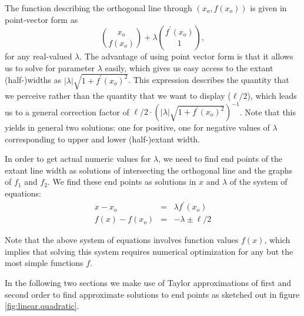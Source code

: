\documentclass[12pt]{article}\usepackage[]{graphicx}\usepackage[]{color}
\begin{document}
The function describing the orthogonal line through $(x_o, f(x_o))$ is given in point-vector form as 
\[
{x_o \choose f(x_o)} + \lambda {f^\prime(x_o) \choose 1}, 
\]
for any real-valued $\lambda$.
The advantage of using point vector form is that it allows us to solve for parameter $\lambda$ easily, which gives us easy access to the extant (half-)widths as
${|\lambda| \sqrt{1 + f^\prime(x_o)^2}}$. This expression describes the quantity that we perceive rather than the quantity that we want to display ($\ell/2$), which leads us to a general correction factor of
$
 {\ell/2 \cdot \left(|\lambda| \sqrt{1 + f^\prime(x_o)^2}\right)^{-1}}
$.
Note that this yields in general two solutions: one for positive, one for negative values of $\lambda$ corresponding to upper and lower (half-)extant width.

In order to get  actual numeric values for $\lambda$, we need to find end points of the extant line width as solutions of intersecting the orthogonal line and  the graphs of $f_1$ and $f_2$. We find these end points  as solutions in $x$ and $\lambda$ of the system of equations:
\begin{eqnarray}\label{eqn.general}
 x - x_o &=& \lambda f^\prime(x_o)\\ \label{eqn.general.2}
 f(x) - f(x_o) &=& -\lambda \pm \ell/2
\end{eqnarray}


Note that  the above system of equations involves function values $f(x)$, which implies that solving this system  requires numerical optimization for any but the most simple functions $f$.

In the following two sections we make use of Taylor approximations of first and second order to find approximate solutions to end points as sketched out in figure \ref{fig:linear.quadratic}.
\end{document}
